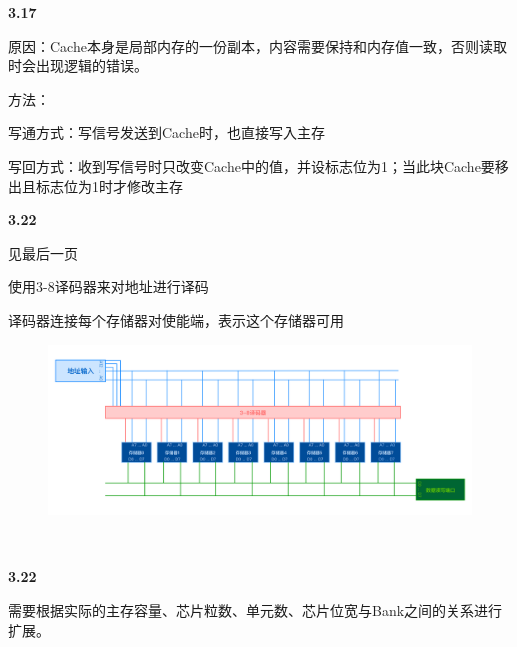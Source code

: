 \documentclass{article}
\begin{document}
    \noindent\textbf{3.17}\par
    原因：Cache本身是局部内存的一份副本，内容需要保持和内存值一致，否则读取时会出现逻辑的错误。\par
    方法：\par
    \qquad{}写通方式：写信号发送到Cache时，也直接写入主存\par
    \qquad{}写回方式：收到写信号时只改变Cache中的值，并设标志位为1；当此块Cache要移出且标志位为1时才修改主存
    \\[4pt]\par

    \noindent\textbf{3.22}\par
    见最后一页\par
    使用3-8译码器来对地址进行译码\par
    译码器连接每个存储器对使能端，表示这个存储器可用
    \\
    \begin{figure}[h]
        \centering
        \includegraphics[scale=0.18]{hw3.png}
    \end{figure}
    \\[4pt]\par

    \noindent\textbf{3.22}\par
    需要根据实际的主存容量、芯片粒数、单元数、芯片位宽与Bank之间的关系进行扩展。
    \\[4pt]\par
\end{document}
